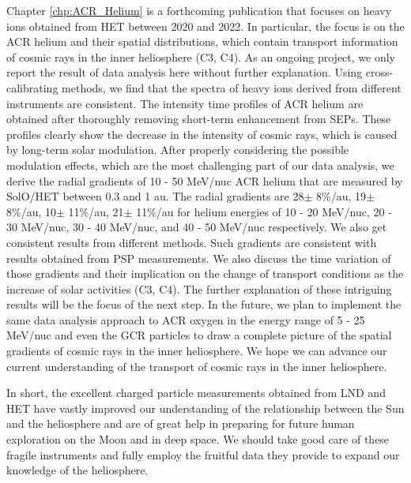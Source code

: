 

Chapter \ref{chp:ACR_Helium} is a forthcoming publication that focuses on heavy ions obtained from \ac{HET} between 2020 and 2022. In particular, the focus is on the \ac{ACR} helium and their spatial distributions, which contain transport information of cosmic rays in the inner heliosphere (C3, C4). As an ongoing project, we only report the result of data analysis here without further explanation. Using cross-calibrating methods, we find that the spectra of heavy ions derived from different instruments are consistent. The intensity time profiles of \ac{ACR} helium are obtained after thoroughly removing short-term enhancement from \acp{SEP}. These profiles clearly show the decrease in the intensity of cosmic rays, which is caused by long-term solar modulation.
After properly considering the possible modulation effects, which are the most challenging part of our data analysis, we derive the radial gradients of 10 - 50 MeV/nuc \ac{ACR} helium that are measured by \ac{SolO}/\ac{HET} between 0.3 and 1 au. The radial gradients are 28$\pm$ 8\%/au, 19$\pm$ 8\%/au, 10$\pm$ 11\%/au, 21$\pm$ 11\%/au for helium energies of 10 - 20 MeV/nuc, 20 - 30 MeV/nuc, 30 - 40 MeV/nuc, and 40 - 50 MeV/nuc respectively. We also get consistent results from different methods.
Such gradients are consistent with results obtained from \ac{PSP} measurements. We also discuss the time variation of those gradients and their implication on the change of transport conditions as the increase of solar activities (C3, C4). The further explanation of these intriguing results will be the focus of the next step. In the future,  we plan to implement the same data analysis approach to \ac{ACR} oxygen in the energy range of 5 - 25 MeV/nuc and even the \ac{GCR} particles to draw a complete picture of the spatial gradients of cosmic rays in the inner heliosphere. 
We hope we can advance our current understanding of the transport of cosmic rays in the inner heliosphere.


In short, the excellent charged particle measurements obtained from \ac{LND} and \ac{HET} have vastly improved our understanding of the relationship between the Sun and the heliosphere and are of great help in preparing for future human exploration on the Moon and in deep space. We should take good care of these fragile instruments and fully employ the fruitful data they provide to expand our knowledge of the heliosphere.




